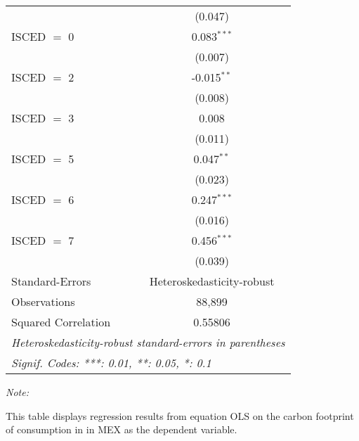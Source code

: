 \begin{table}[htbp!]
\begin{adjustbox}{width = 1\textwidth, max height = 0.95\textheight, center}
\begin{threeparttable}[b]
\begin{tabular}{lc}
                                & (0.047)\\   
            ISCED $=$ 0         & 0.083$^{***}$\\   
                                & (0.007)\\   
            ISCED $=$ 2         & -0.015$^{**}$\\   
                                & (0.008)\\   
            ISCED $=$ 3         & 0.008\\   
                                & (0.011)\\   
            ISCED $=$ 5         & 0.047$^{**}$\\   
                                & (0.023)\\   
            ISCED $=$ 6         & 0.247$^{***}$\\   
                                & (0.016)\\   
            ISCED $=$ 7         & 0.456$^{***}$\\   
                                & (0.039)\\   
            \midrule 
            Standard-Errors     & Heteroskedasticity-robust \\   
            Observations        & 88,899\\  
            Squared Correlation & 0.55806\\  
            \midrule \midrule
            \multicolumn{2}{l}{\emph{Heteroskedasticity-robust standard-errors in parentheses}}\\
            \multicolumn{2}{l}{\emph{Signif. Codes: ***: 0.01, **: 0.05, *: 0.1}}\\
         \end{tabular}
         
         \begin{tablenotes}\item \medskip \textit{Note:}
            \item This table displays regression results from equation OLS on the carbon footprint of consumption in  in MEX as the dependent variable.  
         \end{tablenotes}
      \end{threeparttable}
   \end{adjustbox}
\end{table}


